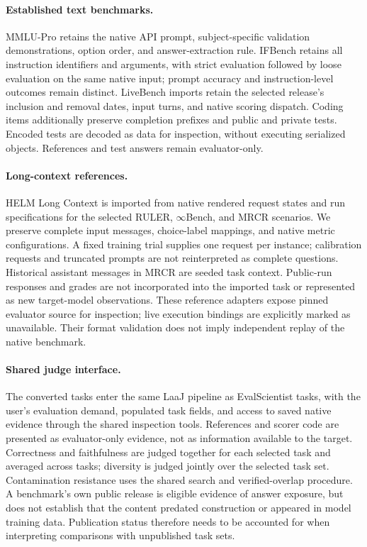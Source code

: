 \documentclass{article} %
\begin{document}
	\paragraph{Established text benchmarks.}
	MMLU-Pro retains the native API prompt, subject-specific validation
	demonstrations, option order, and answer-extraction rule. IFBench retains
	all instruction identifiers and arguments, with strict evaluation followed
	by loose evaluation on the same native input; prompt accuracy and
	instruction-level outcomes remain distinct. LiveBench imports retain the
	selected release's inclusion and removal dates, input turns, and native
	scoring dispatch. Coding items additionally preserve completion prefixes
	and public and private tests. Encoded tests are decoded as data for
	inspection, without executing serialized objects. References and test
	answers remain evaluator-only.

	\paragraph{Long-context references.}
	HELM Long Context is imported from native rendered request states and run
	specifications for the selected RULER, $\infty$Bench, and MRCR scenarios.
	We preserve complete input messages, choice-label mappings, and native
	metric configurations. A fixed training trial supplies one request per
	instance; calibration requests and truncated prompts are not reinterpreted
	as complete questions. Historical assistant messages in MRCR are seeded
	task context. Public-run responses and grades are not incorporated into
	the imported task or represented as new target-model observations.
	These reference adapters expose pinned evaluator source for inspection;
	live execution bindings are explicitly marked as unavailable. Their format
	validation does not imply independent replay of the native benchmark.

	\paragraph{Shared judge interface.}
	The converted tasks enter the same LaaJ pipeline as EvalScientist tasks, with the
	user's evaluation demand, populated task fields, and access to saved native
	evidence through the shared inspection tools. References and scorer code
	are presented as evaluator-only evidence, not as information available to
	the target. Correctness and faithfulness are judged together for each
	selected task and averaged across tasks; diversity is judged jointly over
	the selected task set. Contamination resistance uses the shared search and
	verified-overlap procedure. A benchmark's own public release is eligible
	evidence of answer exposure, but does not establish that the content
	predated construction or appeared in model training data. Publication status
	therefore needs to be accounted for when interpreting comparisons with
	unpublished task sets.
\end{document}
